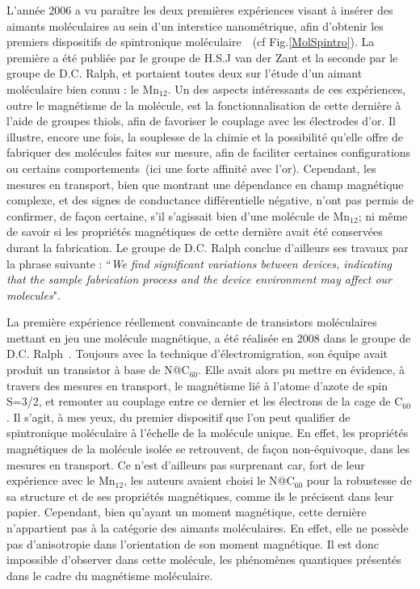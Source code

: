 L'année 2006 a vu paraître les deux premières expériences visant à insérer des aimants moléculaires au sein d'un interstice nanométrique, afin d'obtenir les premiers dispositifs de spintronique moléculaire~\cite{Heersche2006,Jo2006}~(cf Fig.\ref{MolSpintro}). La première a été publiée par le groupe de H.S.J van der Zant et la seconde par le groupe de D.C. Ralph, et portaient toutes deux sur l'étude d'un aimant moléculaire bien connu : le Mn$_{12}$. Un des aspects intéressants de ces expériences, outre le magnétisme de la molécule, est la fonctionnalisation de cette dernière à l'aide de groupes thiols, afin de favoriser le couplage avec les électrodes d'or. Il illustre, encore une fois, la souplesse de la chimie et la possibilité qu'elle offre de fabriquer des molécules faites sur mesure, afin de faciliter certaines configurations ou certains comportements~(ici une forte affinité avec l'or).  
Cependant, les mesures en transport, bien que montrant une dépendance en champ magnétique complexe, et des signes de conductance différentielle négative, n'ont pas permis de confirmer, de façon certaine, s'il s'agissait bien d'une molécule de Mn$_{12}$; ni même de savoir si les propriétés magnétiques de cette dernière avait été conservées durant la fabrication. Le groupe de D.C. Ralph conclue d'ailleurs ses travaux par la phrase suivante : ``\textit{We find significant variations between devices, indicating that the sample fabrication process and the device environment may affect our molecules}".

La première expérience réellement convaincante de transistors moléculaires mettant en jeu une molécule magnétique, a été réalisée en 2008 dans le groupe de D.C. Ralph~\cite{Grose2008}. Toujours avec la technique d'électromigration, son équipe avait produit un transistor à base de N@C$_{60}$. Elle avait alors pu mettre en évidence, à travers des mesures en transport, le magnétisme lié à l'atome d'azote de spin S=3/2,  et remonter au couplage entre ce dernier et les électrons de la cage de C$_{60}$. 
Il s'agit, à mes yeux, du premier dispositif que l'on peut qualifier de spintronique moléculaire à l'échelle de la molécule unique. En effet, les propriétés magnétiques de la molécule isolée se retrouvent, de façon non-équivoque, dans les mesures en transport. Ce n'est d'ailleurs pas surprenant car, fort de leur expérience avec le Mn$_{12}$, les auteurs avaient choisi le N@C$_{60}$ pour la robustesse de sa structure et de ses propriétés magnétiques, comme ils le précisent dans leur papier.
Cependant, bien qu'ayant un moment magnétique, cette dernière n'appartient pas à la catégorie des aimants moléculaires. En effet, elle ne possède pas d'anisotropie dans l'orientation de son moment magnétique. Il est donc impossible d'observer dans cette molécule, les phénomènes quantiques présentés dans le cadre du magnétisme moléculaire.


